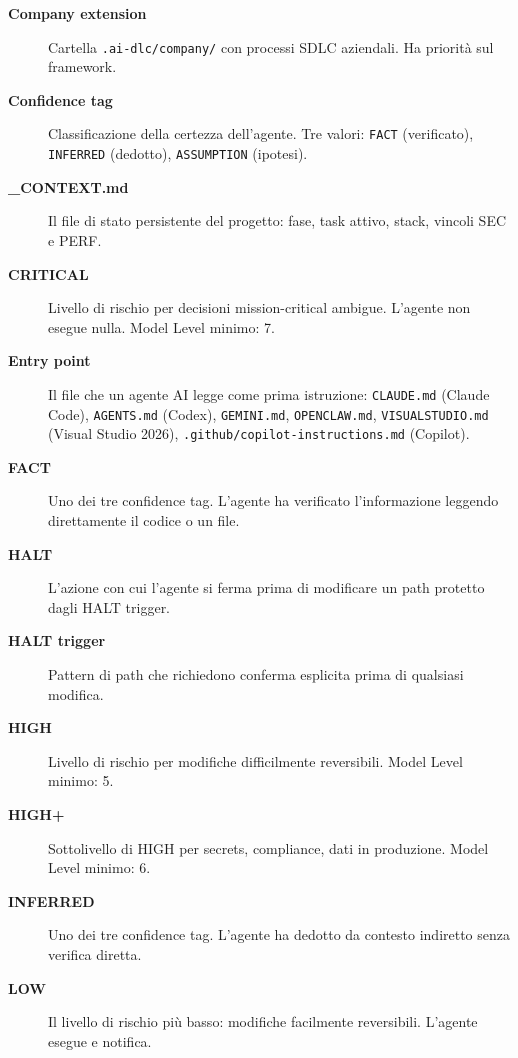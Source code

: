 \begin{description}
\item[\textbf{Company extension}] Cartella \texttt{.ai-dlc/company/} con processi SDLC aziendali. Ha priorità sul framework.

\item[\textbf{Confidence tag}] Classificazione della certezza dell'agente. Tre valori: \texttt{FACT} (verificato), \texttt{INFERRED} (dedotto), \texttt{ASSUMPTION} (ipotesi).

\item[\textbf{\_CONTEXT.md}] Il file di stato persistente del progetto: fase, task attivo, stack, vincoli SEC e PERF.

\item[\textbf{CRITICAL}] Livello di rischio per decisioni mission-critical ambigue. L'agente non esegue nulla. Model Level minimo: 7.

\item[\textbf{Entry point}] Il file che un agente AI legge come prima istruzione: \texttt{CLAUDE.md} (Claude Code), \texttt{AGENTS.md} (Codex), \texttt{GEMINI.md}, \texttt{OPENCLAW.md}, \texttt{VISUALSTUDIO.md} (Visual Studio 2026), \texttt{.github/copilot-instructions.md} (Copilot).

\item[\textbf{FACT}] Uno dei tre confidence tag. L'agente ha verificato l'informazione leggendo direttamente il codice o un file.

\item[\textbf{HALT}] L'azione con cui l'agente si ferma prima di modificare un path protetto dagli HALT trigger.

\item[\textbf{HALT trigger}] Pattern di path che richiedono conferma esplicita prima di qualsiasi modifica.

\item[\textbf{HIGH}] Livello di rischio per modifiche difficilmente reversibili. Model Level minimo: 5.

\item[\textbf{HIGH+}] Sottolivello di HIGH per secrets, compliance, dati in produzione. Model Level minimo: 6.

\item[\textbf{INFERRED}] Uno dei tre confidence tag. L'agente ha dedotto da contesto indiretto senza verifica diretta.

\item[\textbf{LOW}] Il livello di rischio più basso: modifiche facilmente reversibili. L'agente esegue e notifica.


\end{description}
